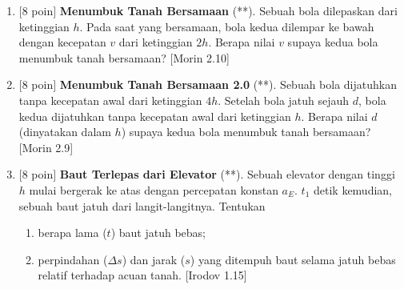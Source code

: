 \documentclass[12pt, a4paper]{article}\usepackage[utf8]{inputenc}
\theoremstyle{definition}
\theoremstyle{definition}
\begin{document}
\begin{enumerate}
		
		
		\item $[$8 poin$]$ \textbf{Menumbuk Tanah Bersamaan} (**). Sebuah bola dilepaskan dari ketinggian $h$. Pada saat yang bersamaan, bola kedua dilempar ke bawah dengan kecepatan $v$ dari ketinggian $2h$. Berapa nilai $v$ supaya kedua bola menumbuk tanah bersamaan? [Morin 2.10]
		
		\item $[$8 poin$]$ \textbf{Menumbuk Tanah Bersamaan 2.0} (**). Sebuah bola dijatuhkan tanpa kecepatan awal dari ketinggian $4h$. Setelah bola jatuh sejauh $d$, bola kedua dijatuhkan tanpa kecepatan awal dari ketinggian $h$. Berapa nilai $d$ (dinyatakan dalam $h$) supaya kedua bola menumbuk tanah bersamaan? [Morin 2.9]
		
		\item $[$8 poin$]$ \textbf{Baut Terlepas dari Elevator} (**). Sebuah elevator dengan tinggi $h$ mulai bergerak ke atas dengan percepatan konstan $a_E$. $t_1$ detik kemudian, sebuah baut jatuh dari langit-langitnya. Tentukan
		
		\begin{enumerate}[label=(\alph*)]
			\item berapa lama ($t$) baut jatuh bebas;
			\item perpindahan ($\Delta s$) dan jarak ($s$) yang ditempuh baut selama jatuh bebas relatif terhadap acuan tanah. [Irodov 1.15]
		\end{enumerate}
		
		\pagebreak
		
		\begin{figure}%
			\centering
			\hspace{8.5em}
\end{figure}
\end{enumerate}
\end{document}
